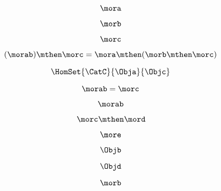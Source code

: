 \begin{forslides}
    \begin{equation}
        \label{eq:semicats-slides-101}
        \mora
    \end{equation}

    \begin{equation}
        \label{eq:semicats-slides-102}
        \morb
    \end{equation}

    \begin{equation}
        \label{eq:semicats-slides-103}
        \morc
    \end{equation}

    \begin{equation}
        \label{eq:semicats-slides-104}
        (\morab) \mthen \morc = \mora \mthen (\morb \mthen \morc)
    \end{equation}

    \begin{equation}
        \label{eq:semicats-slides-105}
        \HomSet{\CatC}{\Obja}{\Objc}
    \end{equation}

    \begin{equation}
        \label{eq:semicats-slides-106}
        \morab = \morc
    \end{equation}

    \begin{equation}
        \label{eq:semicats-slides-107}
        \morab
    \end{equation}

    \begin{equation}
        \label{eq:semicats-slides-108}
        \morc \mthen \mord
    \end{equation}

    \begin{equation}
        \label{eq:semicats-slides-109}
        \more
    \end{equation}

    \begin{equation}
        \label{eq:semicats-slides-110}
        \Objb
    \end{equation}

    \begin{equation}
        \label{eq:semicats-slides-111}
        \Objd
    \end{equation}

    \begin{equation}
        \label{eq:semicats-slides-112}
        \morb
    \end{equation}


\end{forslides}
